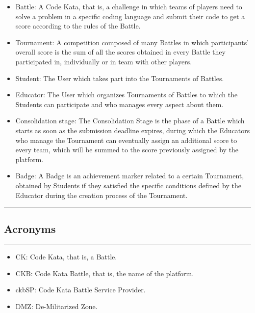 \documentclass{Configuration_Files/Template}
\begin{document}
\begin{itemize}
\item \textcolor{bluepoli}{Battle:} A Code Kata, that is, a challenge in which teams of players need to solve a problem in a specific coding language and submit their code to get a score according to the rules of the Battle.
\item \textcolor{bluepoli}{Tournament:} A competition composed of many Battles in which participants' overall score is the sum of all the scores obtained in every Battle they participated in, individually or in team with other players.
\item \textcolor{bluepoli}{Student:} The User which takes part into the Tournaments of Battles.
\item \textcolor{bluepoli}{Educator:} The User which organizes Tournaments of Battles to which the Students can participate and who manages every aspect about them.
\item \textcolor{bluepoli}{Consolidation stage:} The Consolidation Stage is the phase of a Battle which starts as soon as the submission deadline expires, during which the Educators who manage the Tournament can eventually assign an additional score to every team, which will be summed to the score previously assigned by the platform.
\item \textcolor{bluepoli}{Badge:} A Badge is an achievement marker related to a certain Tournament, obtained by Students if they satisfied the specific conditions defined by the Educator during the creation process of the Tournament.
\end{itemize}

{\color{bluepoli}\rule{\linewidth}{0.1pt}}

\subsection{Acronyms}

{\color{bluepoli}\rule{\linewidth}{0.1pt}}

\begin{itemize}
\item \textcolor{bluepoli}{CK:} Code Kata, that is, a Battle.
\item \textcolor{bluepoli}{CKB:} Code Kata Battle, that is, the name of the platform.
\item \textcolor{bluepoli}{ckbSP:} Code Kata Battle Service Provider.
\item \textcolor{bluepoli}{DMZ:} De-Militarized Zone.
\end{itemize}
\end{document}

